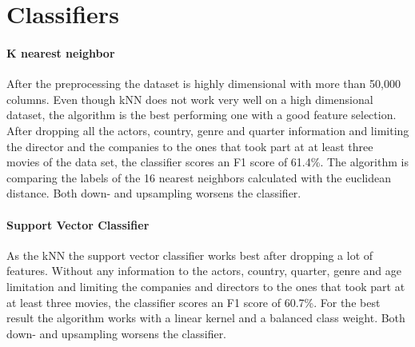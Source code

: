 \section {Classifiers}
\paragraph{K nearest neighbor}
After the preprocessing the dataset is highly dimensional with more than 50,000 columns. Even though kNN does not work very well on a high dimensional dataset, the algorithm is the best performing one with a good feature selection. After dropping all the actors, country, genre and quarter information and limiting the director and the companies to the ones that took part at at least three movies of the data set, the classifier scores an F1 score of 61.4\%. The algorithm is comparing the labels of the 16 nearest neighbors calculated with the euclidean distance. Both down- and upsampling worsens the classifier. 

\paragraph{Support Vector Classifier}
As the kNN the support vector classifier works best after dropping a lot of features. Without any information to the actors, country, quarter, genre and age limitation and limiting the companies and directors to the ones that took part at at least three movies, the classifier scores an F1 score of 60.7\%. For the best result the algorithm works with a linear kernel and a balanced class weight. Both down- and upsampling worsens the classifier.



